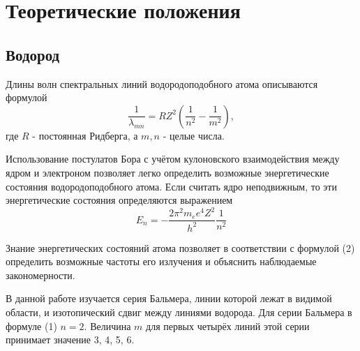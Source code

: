 \documentclass[a4paper]{article}
\begin{document}
\section{Теоретические положения}
\subsection{Водород}
Длины волн спектральных линий водородоподобного атома описываются формулой
\begin{equation}
    \frac{1}{\lambda_{mn}} = RZ^2(\frac{1}{n^2} - \frac{1}{m^2}),
\end{equation}
где $R$ - постоянная Ридберга, а $m, n$ -  целые числа. \par
Использование постулатов Бора с учётом кулоновского взаимодействия между ядром и электроном 
позволяет легко определить возможные энергетические состояния водородоподобного атома. Если 
считать ядро неподвижным, то эти энергетические состояния определяются выражением
\begin{equation}
    E_n = -\frac{2 \pi^2 m_e e^4 Z^2}{h^2} \frac{1}{n^2}
\end{equation}


Знание энергетических состояний атома позволяет в соответствии с формулой (2) определить 
возможные частоты его излучения и объяснить наблюдаемые закономерности. \par
В данной работе изучается серия Бальмера, линии которой лежат в видимой области, и изотопический 
сдвиг между линиями водорода. Для серии Бальмера в формуле (1) $n = 2$. Величина $m$ для первых 
четырёх линий этой серии принимает значение 3, 4, 5, 6. \par
\end{document}
